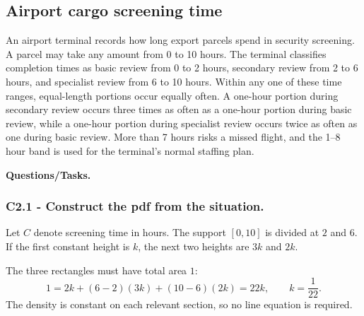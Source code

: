 \subsection{Airport cargo screening time}\label{sec:c2-piecewise-uniform-cargo}
An airport terminal records how long export parcels spend in security
screening.  A parcel may take any amount from 0 to 10 hours.  The terminal
classifies completion times as basic review from 0 to 2 hours, secondary review
from 2 to 6 hours, and specialist review from 6 to 10 hours.  Within any one of
these time ranges, equal-length portions occur equally often.  A one-hour
portion during secondary review occurs three times as often as a one-hour
portion during basic review, while a one-hour portion during specialist review
occurs twice as often as one during basic review.  More than 7 hours risks a
missed flight, and the 1--8 hour band is used for the terminal's normal staffing
plan.

\begingroup{}
\endgroup

\textbf{Questions/Tasks.}
\begin{enumerate}
\end{enumerate}

\subsubsection*{C2.1 - Construct the pdf from the situation.}
\label{subsec:c2-piecewise-uniform-cargo-a}
Let $C$ denote screening time in hours.  The support $[0,10]$ is divided at
$2$ and $6$.  If the first constant height is $k$, the next two heights are
$3k$ and $2k$.

The three rectangles must have total area $1$:
\[
 1=2k+(6-2)(3k)+(10-6)(2k)=22k,\qquad k=\frac1{22}.
\]
The density is constant on each relevant section, so no line equation is required.

